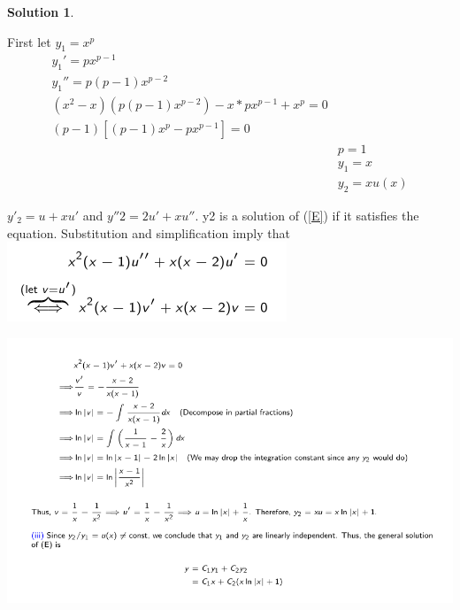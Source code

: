 \documentclass[11pt]{article}
\theoremstyle{definition}
\newtheorem{sln}{Solution}
\begin{document}
\begin{sln}
\begin{shaded}
First let $y_1 = x^p$ \\
\begin{equation}
\begin{split}
y_1' = px^{p-1}  \\
y_1'' = p (p-1) x^{p-2}\\
   (x^2-x)( p (p-1) x^{p-2}) -x * px^{p-1} + x^p =0\\
   (p-1) [(p-1)x^p-px^{p-1}]=0 \\ 
   &p=1 \\
   &y_1 = x\\
  &y_2 = x u(x) 
   \end{split}
\end{equation}
\end{shaded}
$y'_2 = u + xu'$ and $y''2 = 2u' + xu''$.
y2 is a solution of (\ref{E}) if it satisfies the equation. Substitution and simplification imply that
\includegraphics[scale =0.7]{images/sln2.png}\\
\begin{center}
    \includegraphics[scale=0.6]{images/sln1.png}
\end{center}
\end{sln}
\end{document}
